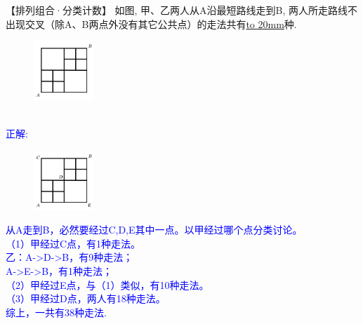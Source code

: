 \item {
    【排列组合·分类计数】
    如图, 甲、乙两人从A沿最短路线走到B, 两人所走路线不出现交叉（除A、B两点外没有其它公共点）的走法共有\underline{\hbox to 20mm{}}种. 
    \begin{figure}[H] 
        \centering
        \includegraphics[width=0.2\textwidth]{./pics/Chapter_4/2016_4.png}
    \end{figure}
    \ifshowSolution 
        \fangsong{}\textcolor{blue}{
            \\正解: \\
            \begin{figure}[H] 
                \centering
                \includegraphics[width=0.2\textwidth]{./pics/Chapter_4/seikai_2016_4.png}
            \end{figure}
            从A走到B，必然要经过C,D,E其中一点。以甲经过哪个点分类讨论。\\
            （1）甲经过C点，有1种走法。\\
            乙：A->D->B，有9种走法；\\
            A->E->B，有1种走法；\\
            （2）甲经过E点，与（1）类似，有10种走法。\\
            （3）甲经过D点，两人有18种走法。\\
            综上，一共有38种走法.
        }
    \else
        \vspace{1cm}
    \fi
}


